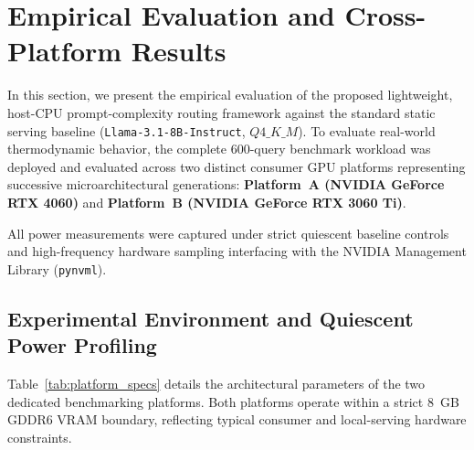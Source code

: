 
\section{Empirical Evaluation and Cross-Platform Results}
\label{sec:results}

In this section, we present the empirical evaluation of the proposed lightweight, host-CPU prompt-complexity routing framework against the standard static serving baseline (\texttt{Llama-3.1-8B-Instruct}, $Q4\_K\_M$). To evaluate real-world thermodynamic behavior, the complete 600-query benchmark workload was deployed and evaluated across two distinct consumer GPU platforms representing successive microarchitectural generations: \textbf{Platform~A (NVIDIA GeForce RTX 4060)} and \textbf{Platform~B (NVIDIA GeForce RTX 3060 Ti)}.

All power measurements were captured under strict quiescent baseline controls and high-frequency hardware sampling interfacing with the NVIDIA Management Library (\texttt{pynvml}).

\subsection{Experimental Environment and Quiescent Power Profiling}
\label{subsec:hardware_setup}

Table~\ref{tab:platform_specs} details the architectural parameters of the two dedicated benchmarking platforms. Both platforms operate within a strict 8~GB GDDR6 VRAM boundary, reflecting typical consumer and local-serving hardware constraints.

\begin{table}[htbp]
\centering
\caption{Microarchitectural Specifications of Evaluated GPU Platforms.}
\label{tab:platform_specs}
\small
{}
\end{table}

